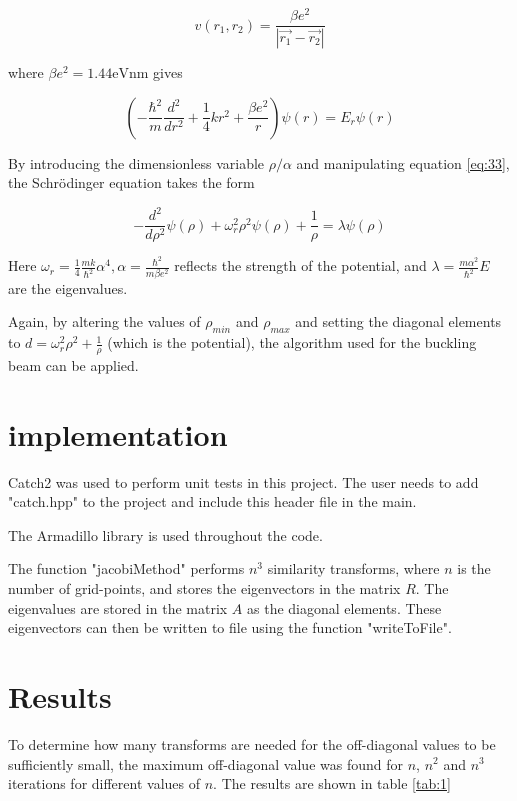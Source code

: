 \documentclass[a4paper,11pt]{article}
\begin{document}
\begin{equation}\label{eq:32}
v(r_1, r_2) = \frac{\beta e^2}{|\vec{r_1} - \vec{r_2}|}
\end{equation}

where $\beta e^2 = 1.44 \si{\eV\nano\metre}$ gives 

\begin{equation}\label{eq:33}
\left(-\frac{\hbar^2}{m}\frac{d^2}{dr^2} + \frac{1}{4}kr^2 + \frac{\beta e^2}{r}\right)\psi(r) = E_r \psi(r)
\end{equation}

By introducing the dimensionless variable $\rho/\alpha$ and manipulating equation \ref{eq:33}, the Schrödinger equation takes the form 

\begin{equation}\label{eq:34}
-\frac{d^2}{d\rho^2}\psi(\rho) + \omega_r^2 \rho^2 \psi(\rho) + \frac{1}{\rho} = \lambda \psi(\rho)
\end{equation}

Here $\omega_r = \frac{1}{4}\frac{mk}{\hbar^2}\alpha^4, \alpha = \frac{\hbar^2}{m\beta e^2}$ reflects the strength of the potential, and $\lambda = \frac{m \alpha^2 }{\hbar^2}E$ are the eigenvalues. 

Again, by altering the values of $\rho_{min}$ and $\rho_{max}$ and setting the diagonal elements to $d = \omega_r^2 \rho^2 + \frac{1}{\rho}$ (which is the potential), the algorithm used for the buckling beam can be applied. 

\section{implementation}
Catch2 was used to perform unit tests in this project. The user needs to add "catch.hpp" to the project and include this header file in the main. 

The Armadillo library is used throughout the code. 

The function "jacobiMethod" performs $n^3$ similarity transforms, where $n$ is the number of grid-points, and stores the eigenvectors in the matrix $R$. The eigenvalues are stored in the matrix $A$ as the diagonal elements. These eigenvectors can then be written to file using the function "writeToFile". 

\section{Results}

To determine how many transforms are needed for the off-diagonal values to be sufficiently small, the maximum off-diagonal value was found for $n$, $n^2$ and $n^3$ iterations for different values of $n$. The results are shown in table \ref{tab:1}
\end{document}
